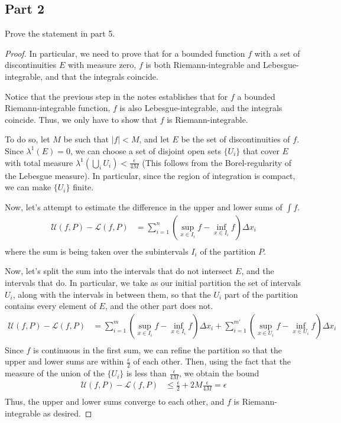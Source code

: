 \documentclass[fontsize=11pt]{scrartcl} %
\numberwithin{equation}{section} %
\numberwithin{figure}{section} %
\numberwithin{table}{section} %
\theoremstyle{definition}
\begin{document}
\subsection*{Part 2}
Prove the statement in part 5.
\\
\begin{proof}
In particular, we need to prove that for a bounded function $f$ with a set of discontinuities
$E$ with measure zero, $f$ is both Riemann-integrable and Lebesgue-integrable, and that the
integrals coincide.

Notice that the previous step in the notes establishes that for $f$ a bounded Riemann-integrable function,
$f$ is also Lebesgue-integrable, and the integrals coincide. Thus, we only have to show
that $f$ is Riemann-integrable.

To do so, let $M$ be such that $|f|<M$, and let $E$ be the set of discontinuities of $f$.
Since $\lambda^1(E) = 0$, we can choose a set of disjoint open sets $\{U_i\}$ that cover $E$
with total measure $\lambda^1(\bigcup_i U_i) < \frac{\epsilon}{4M}$ (This follows from
the Borel-regularity of the Lebesgue measure). In particular, since the region of integration is
compact, we can make $\{U_i\}$ finite.

Now, let's attempt to estimate the difference in the upper and lower sums of $\int f$. 
\[
\begin{aligned}
\mathcal{U}(f,P) -\mathcal{L}(f,P)  &= \sum_{i=1}^n (\sup_{x\in I_i}f -\inf_{x\in I_i}f)\Delta x_i\\
\end{aligned}
\]
where the sum is being taken over the subintervals $I_i$ of the partition $P$.

Now, let's split the sum into the intervals that do not intersect $E$, and the intervals
that do. In particular, we take as our initial partition the set of intervals $U_i$, along
with the intervals in between them, so that the $U_i$ part of the partition contains every
element of $E$, and the other part does not.
\[
\begin{aligned}
\mathcal{U}(f,P) -\mathcal{L}(f,P)  &= \sum_{i=1}^m (\sup_{x\in I_i}f -\inf_{x\in I_i}f)\Delta x_i + \sum_{i=1}^{m'}(\sup_{x\in U_i}f -\inf_{x\in U_i}f)\Delta x_i\\
\end{aligned}
\]
Since $f$ is continuous in the first sum, we can refine the partition so that the upper and
lower sums are within $\frac{\epsilon}{2}$ of each other. Then, using the fact that
the measure of the union of the $\{U_i\}$ is less than $\frac{\epsilon}{4M}$, we obtain the bound
\[
\begin{aligned}
\mathcal{U}(f,P) -\mathcal{L}(f,P)  &\leq \frac{\epsilon}{2} + 2M\frac{\epsilon}{4M} = \epsilon\\
\end{aligned}
\]
Thus, the upper and lower sums converge to each other, and $f$ is Riemann-integrable as desired.
\end{proof}
\newpage
\end{document}
